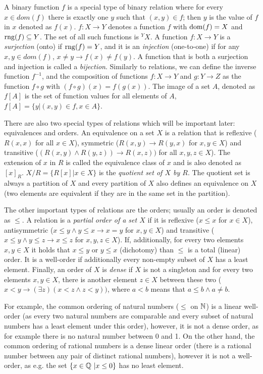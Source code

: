 A binary function $f$ is a special type of binary relation where for every $x \in dom(f)$ there is exactly one $y$ such that $(x,y) \in f$; then $y$ is the value of $f$ in $x$ denoted as $f(x)$. $f: X \to Y$ denotes a function $f$ with $\operatorname{dom}(f) = X$ and $\operatorname{rng}(f) \subseteq Y$. The set of all such functions is $^YX$. A function $f: X \to Y$ is a \emph{surjection} (onto) if $\operatorname{rng}(f)=Y$, and it is an \emph{injection} (one-to-one) if for any $x,y \in dom(f)$, $x \neq y \to f(x) \neq f(y)$. A function that is both a surjection and injection is called a \emph{bijection}. Similarly to relations, we can define the inverse function $f^{-1}$, and the composition of functions $f:X\to Y$ and $g:Y\to Z$ as the function $f \circ g$ with $(f \circ g)(x) = f(g(x))$. The image of a set $A$, denoted as $f[A]$ is the set of function values for all elements of $A$, $f[A] = \{y |(x,y) \in f, x \in A\}$.

There are also two special types of relations which will be important later: equivalences and orders. An equivalence on a set $X$ is a relation that is reflexive ($R(x,x)$ for all $x\in X$), symmetric ($R(x,y) \to R(y,x)$ for $x,y \in X$) and transitive ($(R(x,y) \land R(y,z)) \to R(x,z))$ for all $x,y,z \in X$). The extension of $x$ in $R$ is called the equivalence class of $x$ and is also denoted as $[x]_R$. $X/R = \{R[x] | x \in X\}$ is the \emph{quotient set of $X$ by $R$}. The quotient set is always a partition of $X$ and every partition of $X$ also defines an equivalence on $X$ (two elements are equivalent if they are in the same set in the partition). 

The other important types of relations are the orders; usually an order is denoted as $\leq$. A relation is a \emph{partial order of a set $X$} if it is reflexive ($x \leq x$ for $x \in X$), antisymmetric ($x \leq y \land y \leq x \to x = y$ for $x,y\in X$) and transitive ($x \leq y \land y \leq z \to x \leq z$ for $x,y,z \in X$). If, additionally, for every two elements $x,y \in X$ it holds that $x \leq y$ or $y \leq x$ (dichotomy) than $\leq$ is a total (linear) order. It is a well-order if additionally every non-empty subset of $X$ has a least element. Finally, an order of $X$ is \emph{dense} if $X$ is not a singleton and for every two elements $x,y \in X$, there is another element $z \in X$ between these two ($x < y \to (\exists z) (x < z \land z < y))$, where $a < b$ means that $a \leq b \land a \neq b$. 

For example, the common ordering of natural numbers ($\leq$ on $\mathbb{N}$) is a linear well-order (as every two natural numbers are comparable and every subset of natural numbers has a least element under this order), however, it is not a dense order, as for example there is no natural number between 0 and 1. On the other hand, the common ordering of rational numbers is a dense linear order (there is a rational number between any pair of distinct rational numbers), however it is not a well-order, as e.g. the set $\{x \in \mathbb{Q}\ | x \leq 0\}$ has no least element.


